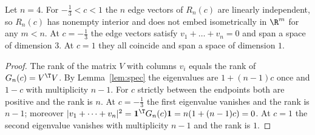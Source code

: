 \begin{theorem}\label{thm:main}
Let $n=4$. For $- \frac{1}{3}<c<1$ the $n$ edge vectors of $R_n(c)$ are linearly independent, so $R_n(c)$ has nonempty interior and does not embed isometrically in $\R^m$ for any $m<n$.
At $c=- \frac{1}{3}$ the edge vectors satisfy $v_1+\dots+v_n=0$ and span a space of dimension $3$.
At $c=1$ they all coincide and span a space of dimension $1$.
\end{theorem}
\begin{proof}
The rank of the matrix $V$ with columns $v_i$ equals the rank of $G_n(c)=V^\T V$.
By Lemma~\ref{lem:spec} the eigenvalues are $1+(n-1)c$ once and $1-c$ with multiplicity $n-1$.
For $c$ strictly between the endpoints both are positive and the rank is $n$.
At $c=- \frac{1}{3}$ the first eigenvalue vanishes and the rank is $n-1$; moreover $|v_1+\dots+v_n|^2=\mathbf 1^\T G_n(c)\mathbf 1=n(1+(n-1)c)=0$.
At $c=1$ the second eigenvalue vanishes with multiplicity $n-1$ and the rank is $1$.
\end{proof}
